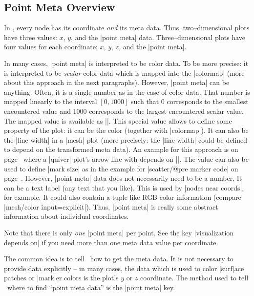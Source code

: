 \subsection{Point Meta Overview}
In \PGFPlots, every node has its coordinate \emph{and} its meta data. Thus, two--dimensional plots have three values: $x$, $y$, and the |point meta| data. Three--dimensional plots have four values for each coordinate: $x$, $y$, $z$, and the |point meta|. 

In many cases, |point meta| is interpreted to be color data. To be more precise: it is interpreted to be \emph{scalar} color data which is mapped into the |colormap| (more about this approach in the next paragraphs). However, |point meta| can be anything. Often, it is a single number as in the case of color data. That number is mapped linearly to the interval $[0,1000]$ such that $0$ corresponds to the smallest encountered value and $1000$ corresponds to the largest encountered scalar value. The mapped value is available as |\pgfplotspointmetatransformed|. This special value allows to define some property of the plot: it can be the color (together with |colormap|). It can also be the |line width| in a |mesh| plot (more precisely: the |line width| could be defined to depend on the transformed meta data). An example for this approach is on page~\pageref{pgfplots:example:pointmeta:quiver} where a |quiver| plot's arrow line with depends on |\pgfplotspointmetatransformed|. The value can also be used to define |mark size| as in the example for |scatter/@pre marker code| on page~\pageref{pgfplots:example:pointmeta:scatter}. However, |point meta| data does not necessarily need to be a number. It can be a text label (any text that you like). This is used by |nodes near coords|, for example. It could also contain a tuple like RGB color information (compare |mesh/color input=explicit|). Thus, |point meta| is really some abstract information about individual coordinates.

Note that there is only \emph{one} |point meta| per point. See the key |visualization depends on| if you need more than one meta data value per coordinate. 

The common idea is to tell \PGFPlots\ how to get the meta data. It is not necessary to provide data explicitly -- in many cases, the data which is used to color |surf|ace patches or |mark|er colors is the plot's $y$ or $z$ coordinate. The method used to tell \PGFPlots\ where to find ``point meta data'' is the |point meta| key. 

